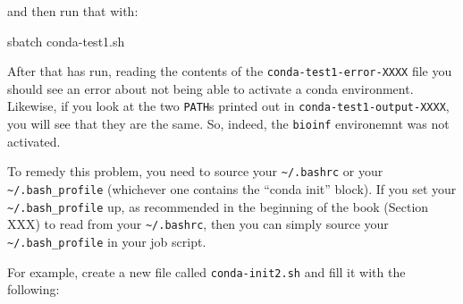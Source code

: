 \documentclass[]{krantz}
\makeatletter
\newenvironment{Shaded}{\begin{snugshade}}{\end{snugshade}}
\newcommand{\BuiltInTok}[1]{#1}
\newcommand{\CommentTok}[1]{\textcolor[rgb]{0.37,0.37,0.37}{\textit{#1}}}
\newcommand{\ExtensionTok}[1]{#1}
\newcommand{\FunctionTok}[1]{\textcolor[rgb]{0,0,0}{#1}}
\newcommand{\NormalTok}[1]{#1}
\newcommand{\StringTok}[1]{\textcolor[rgb]{0.5,0.5,0.5}{#1}}
\newcommand{\VariableTok}[1]{\textcolor[rgb]{0,0,0}{#1}}
\newenvironment{kframe}{%
\medskip{}
\setlength{\fboxsep}{.8em}
 \def\at@end@of@kframe{}%
 \ifinner\ifhmode%
  \def\at@end@of@kframe{\end{minipage}}%
  \begin{minipage}{\columnwidth}%
 \fi\fi%
 \def\FrameCommand##1{\hskip\@totalleftmargin \hskip-\fboxsep
 \colorbox{shadecolor}{##1}\hskip-\fboxsep
     \hskip-\linewidth \hskip-\@totalleftmargin \hskip\columnwidth}%
 \MakeFramed {\advance\hsize-\width
   \@totalleftmargin\z@ \linewidth\hsize
   \@setminipage}}%
 {\par\unskip\endMakeFramed%
 \at@end@of@kframe}
\renewenvironment{Shaded}{\begin{kframe}}{\end{kframe}}
\makeatother
\begin{document}
and then run that with:

\begin{Shaded}
\begin{Highlighting}[]
\ExtensionTok{sbatch}\NormalTok{ conda-test1.sh}
\end{Highlighting}
\end{Shaded}

After that has run, reading the contents of the \texttt{conda-test1-error-XXXX} file you should
see an error about not being able to activate a conda environment. Likewise,
if you look at the two \texttt{PATH}s printed out in \texttt{conda-test1-output-XXXX},
you will see that they are the same. So, indeed, the \texttt{bioinf} environemnt
was not activated.

To remedy this problem, you need to source your \texttt{\textasciitilde{}/.bashrc} or your
\texttt{\textasciitilde{}/.bash\_profile} (whichever one contains the ``conda init'' block).
If you set your \texttt{\textasciitilde{}/.bash\_profile} up, as recommended in the beginning of the
book (Section XXX) to read from your \texttt{\textasciitilde{}/.bashrc}, then you can simply source
your \texttt{\textasciitilde{}/.bash\_profile} in your job script.

For example, create a new file called \texttt{conda-init2.sh} and fill it with
the following:

\begin{Shaded}
\end{Shaded}
\end{document}
